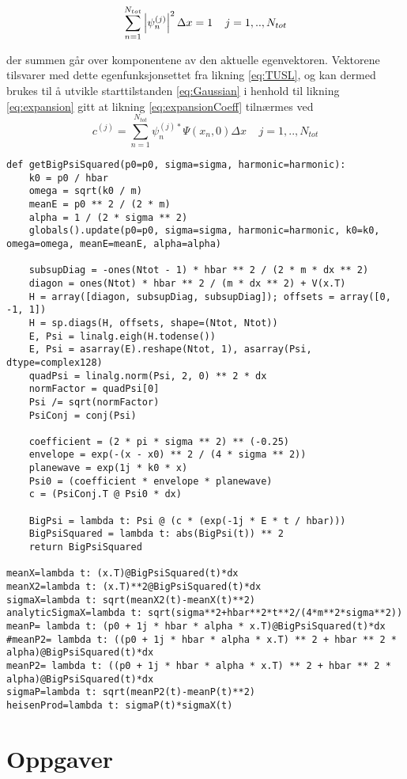 \documentclass[11pt]{article}
\begin{document}
\begin{equation}\label{eq:psiDotpsiNum}
    \sum_{n=1}^{N_{tot}} \left| \space \psi_n^{(j)} \right|^2 \Delta x =1 \;\;\;\;  j=1,..,N_{tot}
\end{equation}

der summen går over komponentene av den aktuelle egenvektoren. Vektorene
tilsvarer med dette egenfunksjonsettet fra likning \eqref{eq:TUSL}, og
kan dermed brukes til å utvikle starttilstanden \eqref{eq:Gaussian} i
henhold til likning \eqref{eq:expansion} gitt at likning
\eqref{eq:expansionCoeff} tilnærmes ved
\begin{equation}\label{eq:NumExpansionCoeff}
    c^{(j)}=\sum_{n=1}^{N_{tot}} \psi_n^{(j)*} \Psi(x_n,0)\Delta x  \;\;\;\;  j=1,..,N_{tot}
\end{equation}
%
\begin{lstlisting}
def getBigPsiSquared(p0=p0, sigma=sigma, harmonic=harmonic):
    k0 = p0 / hbar
    omega = sqrt(k0 / m)
    meanE = p0 ** 2 / (2 * m)
    alpha = 1 / (2 * sigma ** 2)
    globals().update(p0=p0, sigma=sigma, harmonic=harmonic, k0=k0, omega=omega, meanE=meanE, alpha=alpha)

    subsupDiag = -ones(Ntot - 1) * hbar ** 2 / (2 * m * dx ** 2)
    diagon = ones(Ntot) * hbar ** 2 / (m * dx ** 2) + V(x.T)
    H = array([diagon, subsupDiag, subsupDiag]); offsets = array([0, -1, 1])
    H = sp.diags(H, offsets, shape=(Ntot, Ntot))
    E, Psi = linalg.eigh(H.todense())  
    E, Psi = asarray(E).reshape(Ntot, 1), asarray(Psi, dtype=complex128)
    quadPsi = linalg.norm(Psi, 2, 0) ** 2 * dx
    normFactor = quadPsi[0]  
    Psi /= sqrt(normFactor)  
    PsiConj = conj(Psi)

    coefficient = (2 * pi * sigma ** 2) ** (-0.25)
    envelope = exp(-(x - x0) ** 2 / (4 * sigma ** 2))
    planewave = exp(1j * k0 * x)
    Psi0 = (coefficient * envelope * planewave)
    c = (PsiConj.T @ Psi0 * dx)

    BigPsi = lambda t: Psi @ (c * (exp(-1j * E * t / hbar)))
    BigPsiSquared = lambda t: abs(BigPsi(t)) ** 2  
    return BigPsiSquared

meanX=lambda t: (x.T)@BigPsiSquared(t)*dx
meanX2=lambda t: (x.T)**2@BigPsiSquared(t)*dx
sigmaX=lambda t: sqrt(meanX2(t)-meanX(t)**2)
analyticSigmaX=lambda t: sqrt(sigma**2+hbar**2*t**2/(4*m**2*sigma**2))
meanP= lambda t: (p0 + 1j * hbar * alpha * x.T)@BigPsiSquared(t)*dx
#meanP2= lambda t: ((p0 + 1j * hbar * alpha * x.T) ** 2 + hbar ** 2 * alpha)@BigPsiSquared(t)*dx
meanP2= lambda t: ((p0 + 1j * hbar * alpha * x.T) ** 2 + hbar ** 2 * alpha)@BigPsiSquared(t)*dx
sigmaP=lambda t: sqrt(meanP2(t)-meanP(t)**2)
heisenProd=lambda t: sigmaP(t)*sigmaX(t)
\end{lstlisting}
    \hypertarget{oppgaver}{%
\section{Oppgaver}\label{oppgaver}}
\end{document}
